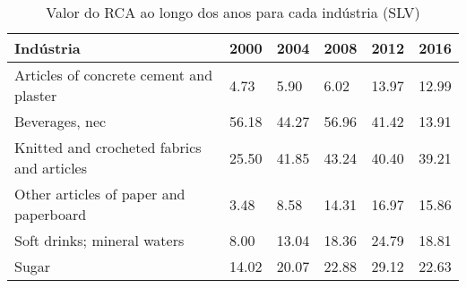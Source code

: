 \begin{table}
\centering
\caption{Valor do RCA ao longo dos anos para cada indústria (SLV)}
\begin{tabular}{p{6cm}p{1.5cm}p{1.5cm}p{1.5cm}p{1.5cm}p{1.5cm}}
\toprule
                                 Indústria &  2000 &  2004 &  2008 &  2012 &  2016 \\
\midrule
   Articles of concrete cement and plaster &  4.73 &  5.90 &  6.02 & 13.97 & 12.99 \\
                            Beverages, nec & 56.18 & 44.27 & 56.96 & 41.42 & 13.91 \\
Knitted and crocheted fabrics and articles & 25.50 & 41.85 & 43.24 & 40.40 & 39.21 \\
    Other articles of paper and paperboard &  3.48 &  8.58 & 14.31 & 16.97 & 15.86 \\
               Soft drinks; mineral waters &  8.00 & 13.04 & 18.36 & 24.79 & 18.81 \\
                                     Sugar & 14.02 & 20.07 & 22.88 & 29.12 & 22.63 \\
\bottomrule
\end{tabular}
\end{table}
